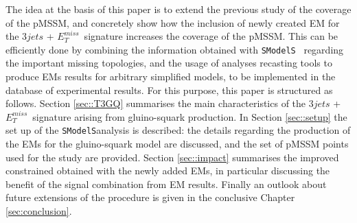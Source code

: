 \documentclass[preprint,number,sort&compress,twocolumn,3p]{elsstyarticle}
\newcommand{\MET}{{ $E_T ^{miss}$}}
\newcommand{\SMO}{\texttt{SModelS\xspace}}
\begin{document}
The idea at the basis of this paper is to extend the previous study of the coverage of the pMSSM, and concretely show how the inclusion of newly created EM for the $3jets$ + \MET~signature increases the coverage of the pMSSM. This can be efficiently done by combining the information obtained with \SMO~ regarding the important missing topologies, and the usage of analyses recasting tools to produce EMs results for arbitrary simplified models, to be implemented in the database of experimental results. For this purpose, this paper is structured as follows. Section \ref{sec::T3GQ} summarises the main characteristics of the $3jets$ + \MET~signature arising from gluino-squark production. In Section \ref{sec::setup} the set up of the \SMO analysis is described: the details regarding the production of the EMs for the gluino-squark model are discussed, and the set of pMSSM points used for the study are provided. Section \ref{sec::impact} summarises the improved constrained obtained with the newly added EMs, in particular discussing the benefit of the signal combination from EM results. Finally an outlook about future extensions of the procedure is given in the conclusive Chapter \ref{sec:conclusion}.  
%
\end{document}
